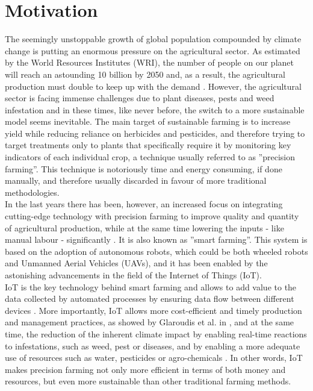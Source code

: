 \chapter{Motivation}
The seemingly unstoppable growth of global population compounded by climate change is putting an enormous pressure on the agricultural sector. As estimated by the World Resources Institutes (WRI), the number of people on our planet will reach an astounding 10 billion by 2050  \cite{ayaz_internet--things_2019} and, as a result, the agricultural production must double to keep up with the demand \cite{singh_machine_2016}. However, the agricultural sector is facing immense challenges due to plant diseases, pests and weed infestation and in these times, like never before, the switch to a more sustainable model seems inevitable. The main target of sustainable farming is to increase yield while reducing reliance on herbicides and pesticides, and therefore trying to target treatments only to plants that specifically require it by monitoring key indicators of each individual crop, a technique usually referred to as ''precision farming''. This technique is notoriously time and energy consuming, if done manually, and therefore usually discarded in favour of more traditional methodologies. \cite{lottes_effective_2016}\\
In the last years there has been, however, an increased focus on integrating cutting-edge technology with precision farming to improve quality and quantity of agricultural production, while at the same time lowering the inputs - like manual labour - significantly \cite{islam_review_2021}.  It is also known as ''smart farming''.  This system is based on the adoption of autonomous robots, which could be both wheeled robots and Unmanned Aerial Vehicles (UAVs), and it has been enabled by the astonishing advancements in the field of the Internet of Things (IoT). \\
IoT is the key technology behind smart farming and allows to add value to the data collected by automated processes by ensuring data flow between different devices  \cite{islam_review_2021}.  More importantly, IoT allows more cost-efficient and timely production and management practices, as showed by  Glaroudis et al. in \cite{glaroudis_survey_2020}, and at the same time, the reduction of the inherent climate impact by enabling real-time reactions to infestations,  such as weed, pest or diseases, and by enabling a more adequate use of resources such as water, pesticides or agro-chemicals \cite{islam_review_2021}.
In other words, IoT makes precision farming not only more efficient in terms of both money and resources, but even more sustainable than other traditional farming methods. \\
